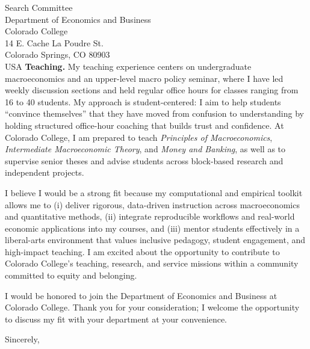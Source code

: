 \documentclass[11pt,letterpaper]{letter}
\begin{document}
\begin{letter}{Search Committee \\
Department of Economics and Business \\
Colorado College \\
14 E. Cache La Poudre St. \\
Colorado Springs, CO 80903 \\ USA}
\textbf{Teaching.} My teaching experience centers on undergraduate macroeconomics and an upper-level macro policy seminar, where I have led weekly discussion sections and held regular office hours for classes ranging from 16 to 40 students. My approach is student-centered: I aim to help students “convince themselves” that they have moved from confusion to understanding by holding structured office-hour coaching that builds trust and confidence. At Colorado College, I am prepared to teach \textit{Principles of Macroeconomics}, \textit{Intermediate Macroeconomic Theory}, and \textit{Money and Banking}, as well as to supervise senior theses and advise students across block-based research and independent projects.

I believe I would be a strong fit because my computational and empirical toolkit allows me to (i) deliver rigorous, data-driven instruction across macroeconomics and quantitative methods, (ii) integrate reproducible workflows and real-world economic applications into my courses, and (iii) mentor students effectively in a liberal-arts environment that values inclusive pedagogy, student engagement, and high-impact teaching. I am excited about the opportunity to contribute to Colorado College’s teaching, research, and service missions within a community committed to equity and belonging.

I would be honored to join the Department of Economics and Business at Colorado College. Thank you for your consideration; I welcome the opportunity to discuss my fit with your department at your convenience.

\closing{Sincerely,}

\end{letter}
\end{document}
